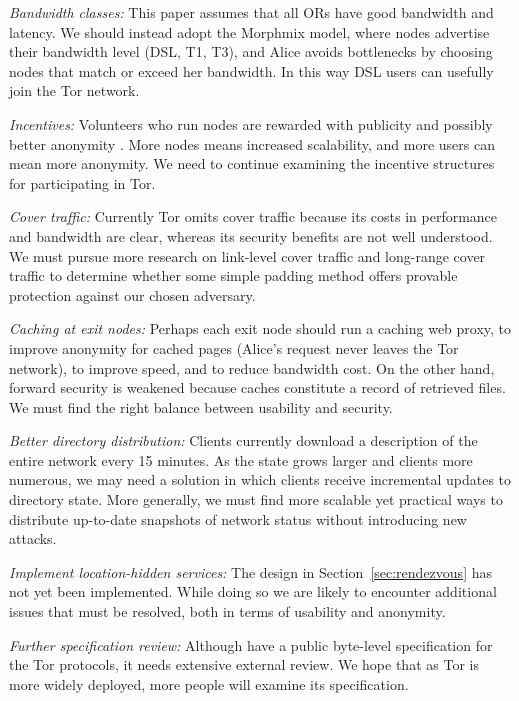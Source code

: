\documentclass[times,10pt,twocolumn]{article}
\begin{document}
\emph{Bandwidth classes:} This paper assumes that all ORs have
good bandwidth and latency. We should instead adopt the Morphmix model,
where nodes advertise their bandwidth level (DSL, T1, T3), and
Alice avoids bottlenecks by choosing nodes that match or
exceed her bandwidth. In this way DSL users can usefully join the Tor
network.

\emph{Incentives:} Volunteers who run nodes are rewarded with publicity
and possibly better anonymity \cite{econymics}. More nodes means increased
scalability, and more users can mean more anonymity. We need to continue
examining the incentive structures for participating in Tor.

\emph{Cover traffic:} Currently Tor omits cover traffic because its costs
in performance and bandwidth are clear, whereas its security benefits are
not well understood. We must pursue more research on link-level cover
traffic and long-range cover traffic to determine whether some simple padding
method offers provable protection against our chosen adversary.


\emph{Caching at exit nodes:} Perhaps each exit node should run a
caching web proxy, to improve anonymity for cached pages (Alice's request never
leaves the Tor network), to improve speed, and to reduce bandwidth cost.
On the other hand, forward security is weakened because caches
constitute a record of retrieved files.  We must find the right
balance between usability and security.

\emph{Better directory distribution:}
Clients currently download a description of
the entire network every 15 minutes. As the state grows larger
and clients more numerous, we may need a solution in which
clients receive incremental updates to directory state.
More generally, we must find more
scalable yet practical ways to distribute up-to-date snapshots of
network status without introducing new attacks.

\emph{Implement location-hidden services:} The design in
Section~\ref{sec:rendezvous} has not yet been implemented.  While doing
so we are likely to encounter additional issues that must be resolved,
both in terms of usability and anonymity.

\emph{Further specification review:} Although have a public
byte-level specification for the Tor protocols, it needs
extensive external review.  We hope that as Tor
is more widely deployed, more people will examine its
specification.
\end{document}
